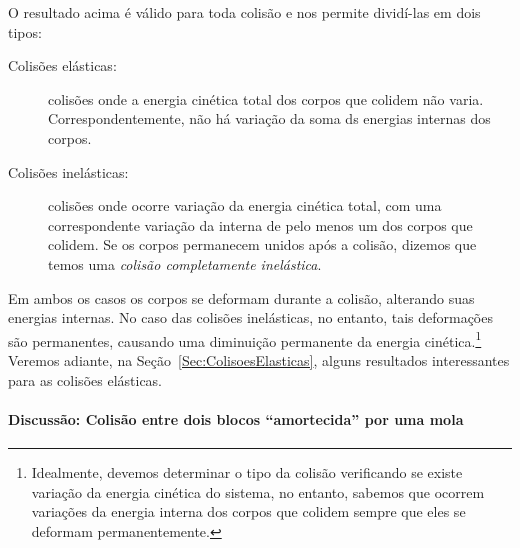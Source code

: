 O resultado acima é válido para toda colisão e nos permite dividí-las em dois tipos:
\begin{description}
    \item[Colisões elásticas:] colisões onde a energia cinética total dos corpos que colidem não varia. Correspondentemente, não há variação da soma ds energias internas dos corpos.
    
    \item[Colisões inelásticas:] colisões onde ocorre variação da energia cinética total, com uma correspondente variação da interna de pelo menos um dos corpos que colidem. Se os corpos permanecem unidos após a colisão, dizemos que temos uma \emph{colisão completamente inelástica}.
\end{description}
%
Em ambos os casos os corpos se deformam durante a colisão, alterando suas energias internas. No caso das colisões inelásticas, no entanto, tais deformações são permanentes, causando uma diminuição permanente da energia cinética.\footnote[][-4cm]{Idealmente, devemos determinar o tipo da colisão verificando se existe variação da energia cinética do sistema, no entanto, sabemos que ocorrem variações da energia interna dos corpos que colidem sempre que eles se deformam permanentemente.} Veremos adiante, na Seção~\ref{Sec:ColisoesElasticas}, alguns resultados interessantes para as colisões elásticas.



\paragraph{Discussão: Colisão entre dois blocos ``amortecida'' por uma mola}

